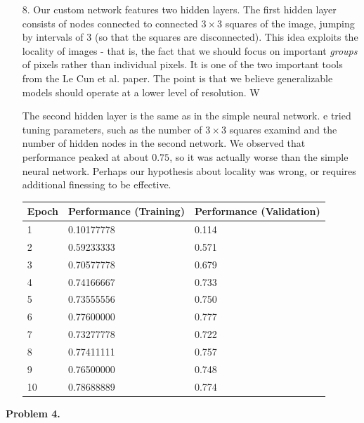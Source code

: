 \documentclass[12pt]{amsart}
\theoremstyle{remark}
\begin{document}
\begin{itemize}
\begin{itemize}
\end{itemize}

\item[8.] Our custom network features two hidden layers. The first hidden layer consists of nodes connected 
to connected $3 \times 3$ squares of the image, jumping by intervals of $3$ (so that the squares are 
disconnected). This idea exploits the locality of images - that is, the fact that we should focus on important 
\emph{groups} of pixels rather than individual pixels. It is one of the two important tools from the Le Cun et 
al. paper. The point is that we believe generalizable models should operate at a lower level of resolution. W

The second hidden layer is the same as in the simple neural network. e tried tuning parameters, such as the number of $3 \times 3$ squares examind and the number of hidden nodes in the second network. We observed that performance peaked 
at about $0.75$, so it was actually worse than the simple neural network. Perhaps our hypothesis about 
locality was wrong, or requires additional finessing to be effective. 


\begin{tabular}{|lll|}
\hline
Epoch & Performance (Training) & Performance (Validation) \\
\hline
1 & 0.10177778 & 0.114 \\
2 & 0.59233333 & 0.571 \\
3 & 0.70577778 & 0.679 \\
4 & 0.74166667 & 0.733 \\
5 & 0.73555556 & 0.750 \\
6 &  0.77600000 & 0.777 \\
7 & 0.73277778 & 0.722 \\
8 & 0.77411111 & 0.757 \\
9 & 0.76500000 & 0.748 \\
10 & 0.78688889 & 0.774 \\
\hline 
\end{tabular}
\end{itemize}


\noindent \textbf{Problem 4.}
\end{document}
